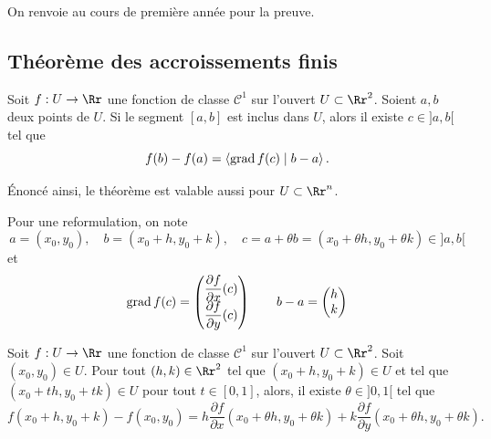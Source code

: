 \documentclass[12pt, class=report,crop=false]{standalone}
\begin{document}
On renvoie au cours de première année pour la preuve.


\subsection{Théorème des accroissements finis}


\begin{theoreme}
Soit $f: U \to \Rr$ une fonction de classe $\mathcal{C}^1$ sur l'ouvert $U \subset \Rr^2$. Soient $a,b$ deux points de $U$. Si le segment $[a,b]$ est inclus dans $U$, alors il existe 
$c \in ]a,b[$ tel que
$$f(b)-f(a) = \left\langle \operatorname{grad} f (c) \mid b-a \right\rangle.$$
\end{theoreme}


\'Enoncé ainsi, le théorème est valable aussi pour $U \subset \Rr^n$.

Pour une reformulation, on note
$$a = (x_0,y_0), \quad b=(x_0+h,y_0+k), \quad c = a+\theta b = (x_0+\theta h,y_0+\theta k) \in ]a,b[$$
et
$$\operatorname{grad} f (c) = 
\begin{pmatrix}
\dfrac{\partial f}{\partial x}(c) \\
\dfrac{\partial f}{\partial y}(c) \end{pmatrix} 
\qquad
b-a = \begin{pmatrix} h \\ k \end{pmatrix} $$


\begin{theoreme}
Soit $f: U \to \Rr$ une fonction de classe $\mathcal{C}^1$ sur l'ouvert $U \subset \Rr^2$. Soit $(x_0,y_0) \in U$. 
Pour tout $(h,k) \in \Rr^2$ tel que $(x_0+h,y_0+k)\in U$
et tel que $(x_0+th,y_0+tk)\in U$ pour tout $t\in[0,1]$,
 alors, il existe $\theta \in ]0,1[$ tel que
$$f(x_0+h,y_0+k) - f(x_0,y_0) = 
h\frac{\partial f}{\partial x}(x_0+\theta h,y_0+\theta k)
+k\frac{\partial f}{\partial y}(x_0+\theta h,y_0+\theta k).$$
\end{theoreme}
\end{document}
